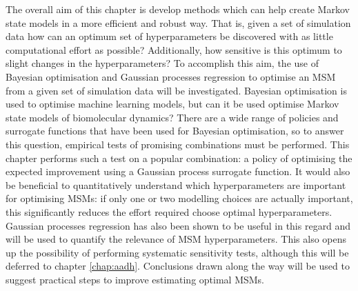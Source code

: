 The overall aim of this chapter is develop methods which can help create Markov state models in a more efficient and robust way. That is, given a set of simulation data how can an optimum set of hyperparameters be discovered with as little computational effort as possible? Additionally, how sensitive is this optimum to slight changes in the hyperparameters? To accomplish this aim, the use of Bayesian optimisation and Gaussian processes regression to optimise an MSM from a given set of simulation data will be investigated. Bayesian optimisation is used to optimise machine learning models, but can it be used optimise Markov state models of biomolecular dynamics?  There are a wide range of policies and surrogate functions that have been used for Bayesian optimisation, so to answer this question, empirical tests of promising combinations must be performed. This chapter performs such a test on a popular combination: a policy of optimising the expected improvement using a Gaussian process surrogate function.  It would also be beneficial to quantitatively understand which hyperparameters are important for optimising MSMs: if only one or two modelling choices are actually important, this significantly reduces the effort required choose optimal hyperparameters.  Gaussian processes regression has also been shown to be useful in this regard and will be used to quantify the relevance of MSM hyperparameters.  This also opens up the possibility of performing systematic sensitivity tests, although this will be deferred to chapter \ref{chap:aadh}.  Conclusions drawn along the way will be used to suggest practical steps to improve estimating optimal MSMs.  


